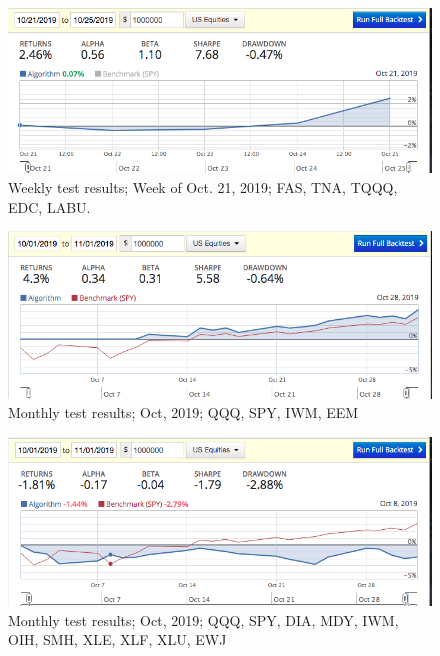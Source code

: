 \documentclass{article}
\begin{document}
\begin{figure}\label{fig:weekly-oct21}
\includegraphics[width = \textwidth]{figures/ab-results-2019-11-05/ab-weekly-oct21-25-2019.png}
\caption{Weekly test results; Week of Oct. 21, 2019; FAS, TNA, TQQQ, EDC, LABU.}
\end{figure}

\begin{figure}\label{fig:monthly-1}
\includegraphics[width = \textwidth]{figures/ab-results-2019-11-05/ab-monthly-oct-2019.png}
\caption{Monthly test results; Oct, 2019; QQQ, SPY, IWM, EEM}
\end{figure}

\begin{figure}\label{fig:monthly-2}
\includegraphics[width = \textwidth]{figures/ab-results-2019-11-05/ab-monthly-oct-2019-11-ETFs.png}
\caption{Monthly test results; Oct, 2019; QQQ, SPY, DIA, MDY, IWM, OIH, SMH, XLE, XLF, XLU, EWJ}
\end{figure}
\end{document}
